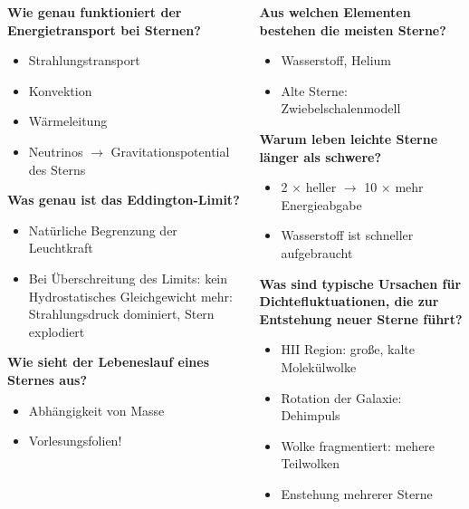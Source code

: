 \begin{frame}{ }
  \begin{columns}
    \begin{column}[t]{0.5\textwidth}
      \textbf{Wie genau funktioniert der Energietransport bei Sternen?}
\begin{itemize}
  \item Strahlungstransport
  \item Konvektion
  \item Wärmeleitung
  \item Neutrinos
  $\rightarrow$ Gravitationspotential des Sterns
\end{itemize}
\vspace{1em}
\textbf{ Was genau ist das Eddington-Limit?}
\begin{itemize}
  \item Natürliche Begrenzung der Leuchtkraft
  \item Bei Überschreitung des Limits: kein Hydrostatisches Gleichgewicht mehr: Strahlungsdruck dominiert, Stern explodiert
\end{itemize}
\vspace{1em}
\textbf{Wie sieht der Lebeneslauf eines Sternes aus?}
\begin{itemize}
  \item Abhängigkeit von Masse
  \item Vorlesungsfolien!
\end{itemize}
    \end{column}
    \begin{column}[t]{0.5\textwidth}
      \textbf{Aus welchen Elementen bestehen die meisten Sterne?}
      \begin{itemize}
        \item Wasserstoff, Helium
        \item Alte Sterne: Zwiebelschalenmodell
      \end{itemize}
      \vspace{1em}
      \textbf{Warum leben leichte Sterne länger als schwere?}
      \begin{itemize}
        \item 2 $\times$ heller $\rightarrow$ 10 $\times$ mehr Energieabgabe
        \item Wasserstoff ist schneller aufgebraucht
      \end{itemize}
      \vspace{1em}
      \textbf{Was sind typische Ursachen für Dichtefluktuationen, die zur Entstehung neuer Sterne führt?}
      \begin{itemize}
        \item HII Region: große, kalte Molekülwolke
        \item Rotation der Galaxie: Dehimpuls
        \item Wolke fragmentiert: mehere Teilwolken
        \item Enstehung mehrerer Sterne
      \end{itemize}
      \end{column}
  \end{columns}
\end{frame}


